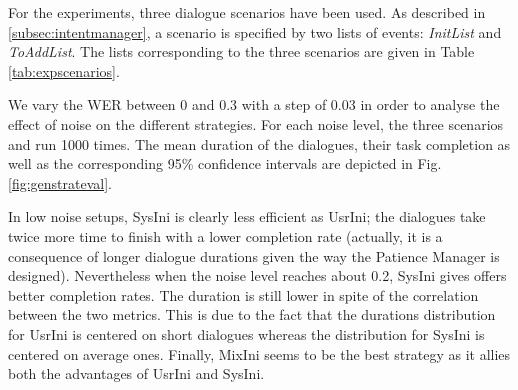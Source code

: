 \begin{figure*}[t!]
\begin{subfigure}[t]{.5\textwidth}
                  \end{subfigure}
                  \caption{Simulated mean duration (left) and dialogue task completion (right) for different noise levels}
                    \label{fig:genstrateval}
              \end{figure*}
              
  		For the experiments, three dialogue scenarios have been used. As described in \ref{subsec:intentmanager}, a scenario is specified by two lists of events: \textit{InitList} and \textit{ToAddList}. The lists corresponding to the three scenarios are given in Table \ref{tab:expscenarios}.
        
       	We vary the WER between 0 and 0.3 with a step of 0.03 in order to analyse the effect of noise on the different strategies. For each noise level, the three scenarios and run 1000 times. The mean duration of the dialogues, their task completion as well as the corresponding 95\% confidence intervals are depicted in Fig. \ref{fig:genstrateval}.
        
        In low noise setups, SysIni is clearly less efficient as UsrIni; the dialogues take twice more time to finish with a lower completion rate (actually, it is a consequence of longer dialogue durations given the way the Patience Manager is designed). Nevertheless when the noise level reaches about 0.2, SysIni gives offers better completion rates. The duration is still lower in spite of the correlation between the two metrics. This is due to the fact that the durations distribution for UsrIni is centered on short dialogues whereas the distribution for SysIni is centered on average ones. Finally, MixIni seems to be the best strategy as it allies both the advantages of UsrIni and SysIni.
        
        
